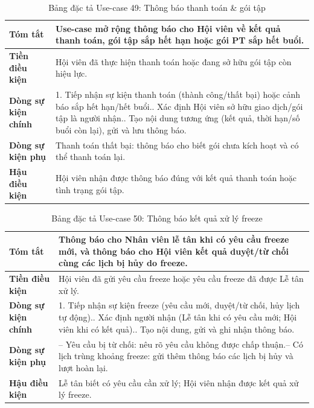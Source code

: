 \documentclass[a4paper,12pt]{article}
\begin{document}
\begin{table}[H]\centering\footnotesize
\begin{tabularx}{\textwidth}{|L{3.2cm}|Y|}
\hline \textbf{Tóm tắt} & Use-case mở rộng thông báo cho Hội viên về kết quả thanh toán, gói tập sắp hết hạn hoặc gói PT sắp hết buổi. \\ \hline
\textbf{Tiền điều kiện} & Hội viên đã thực hiện thanh toán hoặc đang sở hữu gói tập còn hiệu lực. \\ \hline
\textbf{Dòng sự kiện chính} & 1. Tiếp nhận sự kiện thanh toán (thành công/thất bại) hoặc cảnh báo sắp hết hạn/hết buổi.. Xác định Hội viên sở hữu giao dịch/gói tập là người nhận.. Tạo nội dung tương ứng (kết quả, thời hạn/số buổi còn lại), gửi và lưu thông báo. \\ \hline
\textbf{Dòng sự kiện phụ} & Thanh toán thất bại: thông báo cho biết gói chưa kích hoạt và có thể thanh toán lại. \\ \hline
\textbf{Hậu điều kiện} & Hội viên nhận được thông báo đúng với kết quả thanh toán hoặc tình trạng gói tập. \\ \hline
\end{tabularx}
\caption{Bảng đặc tả Use-case 49: Thông báo thanh toán \& gói tập}
\end{table}

\begin{table}[H]\centering\footnotesize
\begin{tabularx}{\textwidth}{|L{3.2cm}|Y|}
\hline \textbf{Tóm tắt} & Thông báo cho Nhân viên lễ tân khi có yêu cầu freeze mới, và thông báo cho Hội viên kết quả duyệt/từ chối cùng các lịch bị hủy do freeze. \\ \hline
\textbf{Tiền điều kiện} & Hội viên đã gửi yêu cầu freeze hoặc yêu cầu freeze đã được Lễ tân xử lý. \\ \hline
\textbf{Dòng sự kiện chính} & 1. Tiếp nhận sự kiện freeze (yêu cầu mới, duyệt/từ chối, hủy lịch tự động).. Xác định người nhận (Lễ tân khi có yêu cầu mới; Hội viên khi có kết quả).. Tạo nội dung, gửi và ghi nhận thông báo. \\ \hline
\textbf{Dòng sự kiện phụ} & -- Yêu cầu bị từ chối: nêu rõ yêu cầu không được chấp thuận.\newline -- Có lịch trùng khoảng freeze: gửi thêm thông báo các lịch bị hủy và lượt hoàn lại. \\ \hline
\textbf{Hậu điều kiện} & Lễ tân biết có yêu cầu cần xử lý; Hội viên nhận được kết quả xử lý freeze. \\ \hline
\end{tabularx}
\caption{Bảng đặc tả Use-case 50: Thông báo kết quả xử lý freeze}
\end{table}
\end{document}
